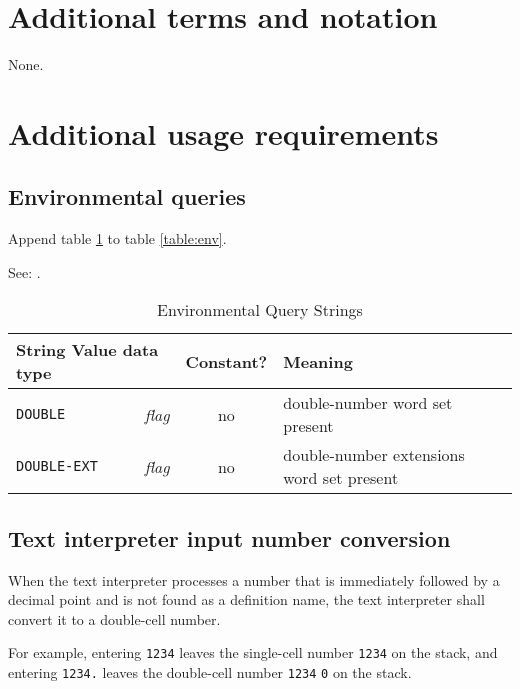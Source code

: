 \section{Additional terms and notation} %

None.

\section{Additional usage requirements} %

\subsection{Environmental queries} %

Append table \ref{double:env} to table \ref{table:env}.

See: .

\begin{table}[ht]
  \begin{center}
	\caption{Environmental Query Strings}
	\label{double:env}
	\begin{tabular}{p{9em}rcp{}}
		\hline\hline
		\multicolumn{2}{l}{String \hfill Value data type} & Constant? & Meaning \\
		\hline
		\texttt{DOUBLE}		& \emph{flag}	& no	&
			double-number word set present \\
		\texttt{DOUBLE-EXT}	& \emph{flag}	& no	&
			double-number extensions word set present \\
		\hline\hline
	\end{tabular}
  \end{center}
\end{table}

\subsection{Text interpreter input number conversion} %

When the text interpreter processes a number that is immediately
followed by a decimal point and is not found as a definition name,
the text interpreter shall convert it to a double-cell number.

For example, entering  \texttt{1234} leaves the
single-cell number \texttt{1234} on the stack, and entering
 \texttt{1234.} leaves the double-cell number
\texttt{1234} \texttt{0} on the stack.

